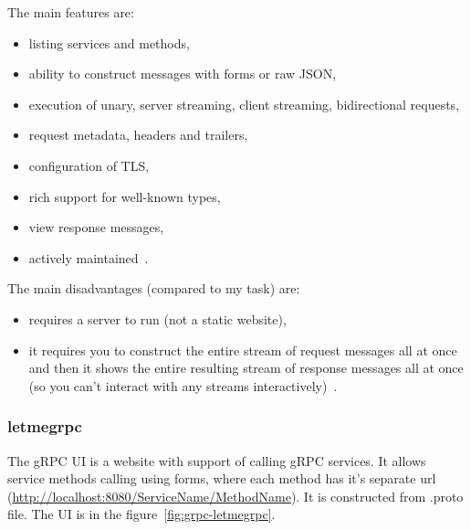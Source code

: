 The main features are:
\begin{itemize}
    \item listing services and methods,
    \item ability to construct messages with forms or raw JSON,
    \item execution of unary, server streaming, client streaming, bidirectional requests,
    \item request metadata, headers and trailers,
    \item configuration of TLS,
    \item rich support for well-known types,
    \item view response messages,
    \item actively maintained~\cite{grpc-grpcui}.
\end{itemize}

The main disadvantages (compared to my task) are:
\begin{itemize}
    \item requires a server to run (not a static website),
    \item it requires you to construct the entire stream of request messages all at once and then it shows the entire resulting stream of response messages all at once (so you can't interact with any streams interactively)~\cite{grpc-grpcui}.
\end{itemize}

\subsubsection{letmegrpc}
The gRPC UI is a website with support of calling gRPC services.
It allows service methods calling using forms, where each method has it's separate url (\url{http://localhost:8080/ServiceName/MethodName}).
It is constructed from .proto file.
The UI is in the figure~\ref{fig:grpc-letmegrpc}.
\cite{grpc-letmegrpc}

